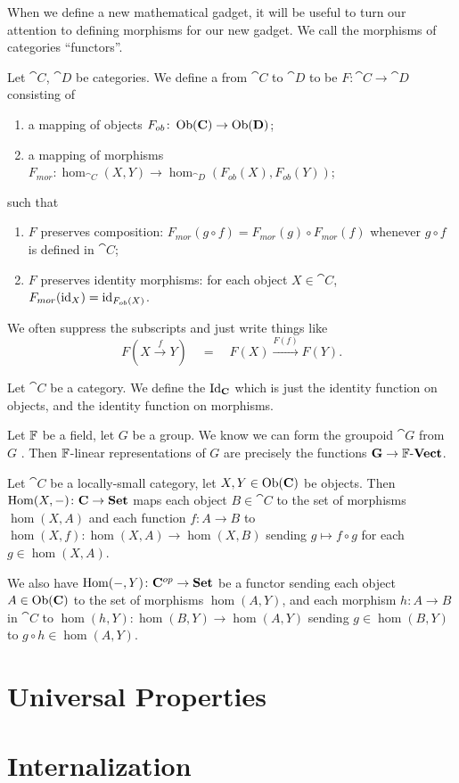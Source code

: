 \begin{node}[Functors]\label{cat-0009}%
When we define a new mathematical gadget, it will be useful to turn our
attention to defining morphisms for our new gadget. We call the
morphisms of categories ``functors''.

\begin{definition}
Let $\cat{C}$, $\cat{D}$ be categories. We define a 
from $\cat{C}$ to $\cat{D}$ to be $F\colon\cat{C}\to\cat{D}$ consisting
of
\begin{enumerate}
\item a mapping of objects $F_{ob}\colon\operatorname{Ob}(\mathbf{C})\to\operatorname{Ob}(\mathbf{D})$;
\item a mapping of morphisms $F_{mor}\colon\hom_{\cat{C}}(X,Y)\to\hom_{\cat{D}}(F_{ob}(X),F_{ob}(Y))$;
\end{enumerate}
such that
\begin{enumerate}
\item $F$ preserves composition: $F_{mor}(g\circ f)=F_{mor}(g)\circ F_{mor}(f)$ whenever
  $g\circ f$ is defined in $\cat{C}$;
\item $F$ preserves identity morphisms: for each object $X\in\cat{C}$, $F_{mor}(\operatorname{id}_{X})=\operatorname{id}_{F_{ob}(X)}$.
\end{enumerate}
We often suppress the subscripts and just write things like
\[F\left(X\xrightarrow{f}Y\right)\quad=\quad F(X)\xrightarrow{F(f)}F(Y).\]
\end{definition}

\begin{node}[Examples]\label{cat-000J}%
\begin{node}\label{cat-000L}%
Let $\cat{C}$ be a category. We define the 
$\operatorname{Id}_{\mathbf{C}}$ which is just the identity function on objects, and the
identity function on morphisms.
\end{node}
  
\begin{node}\label{cat-000K}%
Let $\mathbb{F}$ be a field, let $G$ be a group. We know we can form the
groupoid $\cat{G}$ from $G$ . Then $\mathbb{F}$-linear
representations of $G$ are precisely the functions $\mathbf{G}\to\mathbb{F}\textrm{-}\mathbf{Vect}$.
\end{node}

\begin{node}\label{cat-000N}%
Let $\cat{C}$ be a locally-small category, let $X,Y\in\operatorname{Ob}(\mathbf{C})$ be
objects. Then $\operatorname{Hom}(X,-)\colon\mathbf{C}\to\mathbf{Set}$ maps each object
$B\in\cat{C}$ to the set of morphisms $\hom(X,A)$ and each function
$f\colon A\to B$ to $\hom(X,f)\colon\hom(X,A)\to\hom(X,B)$ sending
$g\mapsto f\circ g$ for each $g\in\hom(X,A)$.

We also have $\operatorname{Hom}(-,Y)\colon\mathbf{C}^{op}\to\mathbf{Set}$ be a functor sending each
object $A\in\operatorname{Ob}(\mathbf{C})$ to the set of morphisms $\hom(A,Y)$, and each
morphism $h\colon A\to B$ in $\cat{C}$ to $\hom(h,Y)\colon\hom(B,Y)\to\hom(A,Y)$
sending $g\in\hom(B,Y)$ to $g\circ h\in\hom(A,Y)$.
\end{node}
\end{node} %
\end{node}

\section{Universal Properties}

\section{Internalization}

